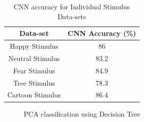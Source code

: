 \begin{appendices}
{
\begin{table}[h!]
\centering
\begin{tabular}{|c|c|}
\hline
Data-set &CNN Accuracy (\%) \\
\hline
Happy Stimulus & 86  \\
Neutral Stimulus & 83.2  \\
Fear Stimulus & 84.9  \\
Tree Stimulus & 78.3 \\
Cartoon Stimulus & 86.4 \\
\hline
\end{tabular}
\caption{CNN accuracy for Individual Stimulus Data-sets}
\label{table:1}
\end{table}
}

\begin{figure}[ht!]%
    \centering
    \qquad
    \qquad
    \caption{PCA classification using Decision Tree}%
    \label{fig:example2}%
\end{figure}

\clearpage

\end{appendices}
